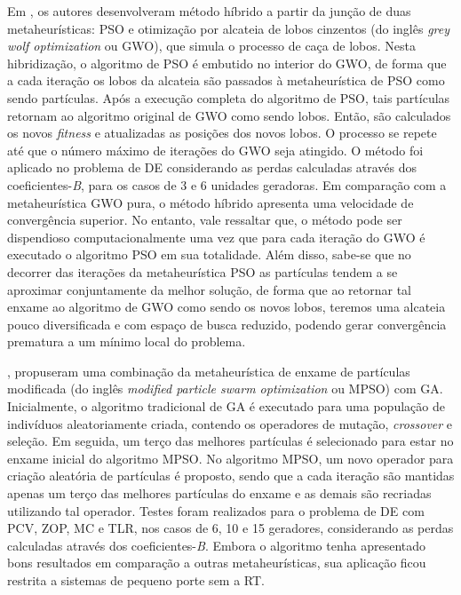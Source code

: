 \documentclass[
	12pt,				%
	openany,			%
	twoside,			%
	a4paper,			%
	chapter=TITLE,		%
	section=Title,		%
	subsection=Title,	%
	subsubsection=Title,%
	english,			%
	french,				%
	spanish,			%
	brazil			%
	]{abntex2}
\begin{document}
\begin{ERRATA}
Em , os autores desenvolveram método híbrido a partir da junção de duas metaheurísticas: PSO e otimização por alcateia de lobos cinzentos (do inglês \emph{grey wolf optimization} ou GWO), que simula o processo de caça de lobos. Nesta hibridização, o algoritmo de PSO é embutido no interior do GWO, de forma que a cada iteração os lobos da alcateia são passados à metaheurística de PSO como sendo partículas. Após a execução completa do algoritmo de PSO, tais partículas retornam ao algoritmo original de GWO como sendo lobos. Então, são calculados os novos \emph{fitness} e atualizadas as posições dos novos lobos. O processo se repete até que o número máximo de iterações do GWO seja atingido. O método foi aplicado no problema de DE considerando as perdas calculadas através dos coeficientes-\emph{B}, para os casos de 3 e 6 unidades geradoras. Em comparação com a metaheurística GWO pura, o método híbrido apresenta uma velocidade de convergência superior. No entanto, vale ressaltar que, o método pode ser dispendioso computacionalmente uma vez que para cada iteração do GWO é executado o algoritmo PSO em sua totalidade. Além disso, sabe-se que no decorrer das iterações da metaheurística PSO as partículas tendem a se aproximar conjuntamente da melhor solução, de forma que ao retornar tal enxame ao algoritmo de GWO como sendo os novos lobos, teremos uma alcateia pouco diversificada e com espaço de busca reduzido, podendo gerar convergência prematura a um mínimo local do problema.

, propuseram uma combinação da metaheurística de enxame de partículas modificada (do inglês \emph{modified particle swarm optimization} ou MPSO) com GA. Inicialmente, o algoritmo tradicional de GA é executado para uma população de indivíduos aleatoriamente criada, contendo os operadores de mutação, \emph{crossover} e seleção. Em seguida, um terço das melhores partículas é selecionado para estar no enxame inicial do algoritmo MPSO. No algoritmo MPSO, um novo operador para criação aleatória de partículas é proposto, sendo que a cada iteração são mantidas apenas um terço das melhores partículas do enxame e as demais são recriadas utilizando tal operador. Testes foram realizados para o problema de DE com PCV, ZOP, MC e TLR, nos casos de 6, 10 e 15 geradores, considerando as perdas calculadas através dos coeficientes-\emph{B}. Embora o algoritmo tenha apresentado bons resultados em comparação a outras metaheurísticas, sua aplicação ficou restrita a sistemas de pequeno porte sem a RT.


\end{ERRATA}
\end{document}
